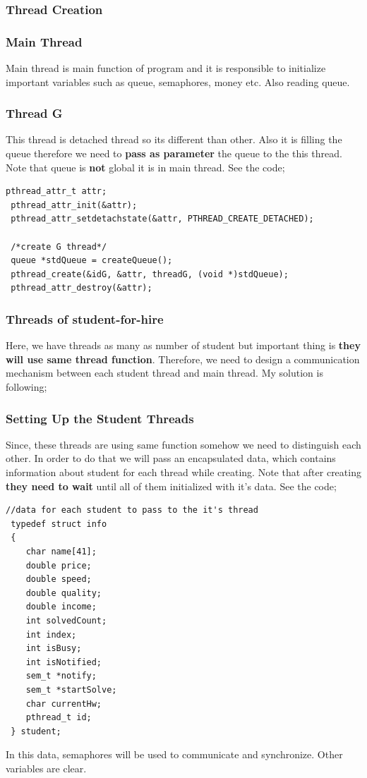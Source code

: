 \documentclass{article}
\begin{document}
\subsubsection{Thread Creation}
\subsubsection*{Main Thread}
Main thread is main function of program and it is responsible to initialize important variables such as queue, semaphores, money etc. Also reading queue.
\subsubsection*{Thread G}
This thread is detached thread so its different than other. Also it is filling the queue therefore we need to \textbf{pass as parameter} the queue
to the this thread. Note that queue is \textbf{not} global it is in main thread. See the code;
\begin{lstlisting}[style=CStyle]
 pthread_attr_t attr;
 pthread_attr_init(&attr);
 pthread_attr_setdetachstate(&attr, PTHREAD_CREATE_DETACHED);

 /*create G thread*/
 queue *stdQueue = createQueue();
 pthread_create(&idG, &attr, threadG, (void *)stdQueue);
 pthread_attr_destroy(&attr);
\end{lstlisting}
\subsubsection*{Threads of student-for-hire}
Here, we have threads as many as number of student but important thing is \textbf{they will use same thread function}. Therefore, 
we need to design a communication mechanism between each student thread and main thread. My solution is following;
\subsubsection*{Setting Up the Student Threads}
Since, these threads are using same function somehow we need to distinguish each other. In order to do that we will pass an encapsulated data,
which contains information about student for each thread while creating. Note that after creating \textbf{they need to wait} until all of them
initialized with it's data. See the code;
\cleardoublepage
\begin{lstlisting}[style=CStyle]
 //data for each student to pass to the it's thread
 typedef struct info
 {
    char name[41];
    double price;
    double speed;
    double quality;
    double income;
    int solvedCount;
    int index;
    int isBusy;
    int isNotified;
    sem_t *notify;
    sem_t *startSolve;
    char currentHw;
    pthread_t id;
 } student;
\end{lstlisting}
In this data, semaphores will be used to communicate and synchronize. Other variables are clear.
\end{document}
